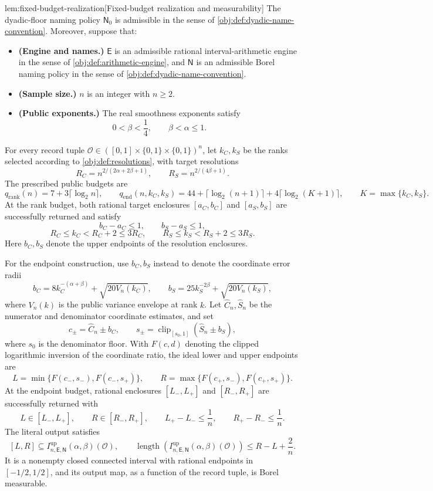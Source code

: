 \documentclass[11pt]{article}
\begin{document}
\begin{lemmav}{lem:fixed-budget-realization}[Fixed-budget realization and measurability]
The dyadic-floor naming policy \(\mathsf N_0\) is admissible in the sense of \cref{obj:def:dyadic-name-convention}. Moreover, suppose that:
\begin{itemize}
\item \textbf{(Engine and names.)} \(\mathsf E\) is an admissible rational interval-arithmetic engine in the sense of \cref{obj:def:arithmetic-engine}, and \(\mathsf N\) is an admissible Borel naming policy in the sense of \cref{obj:def:dyadic-name-convention}.
\item \textbf{(Sample size.)} \(n\) is an integer with \(n\ge2\).
\item \textbf{(Public exponents.)} The real smoothness exponents satisfy
\[
0<\beta<\frac14,\qquad \beta<\alpha\le1.
\]
\end{itemize}
For every record tuple \(\mathcal O\in([0,1]\times\{0,1\}\times\{0,1\})^n\), let \(k_C,k_S\) be the ranks selected according to \cref{obj:def:resolutions}, with target resolutions
\[
R_C=n^{2/(2\alpha+2\beta+1)},\qquad
R_S=n^{2/(4\beta+1)}.
\]
The prescribed public budgets are
\[
q_{\mathrm{rank}}(n)=7+3\lceil\log_2 n\rceil,\qquad
q_{\mathrm{end}}(n,k_C,k_S)
=44+\lceil\log_2(n+1)\rceil
 +4\lceil\log_2(K+1)\rceil,\qquad
K=\max\{k_C,k_S\}.
\]
At the rank budget, both rational target enclosures \([a_C,b_C]\) and \([a_S,b_S]\) are successfully returned and satisfy
\[
b_C-a_C\le1,\qquad b_S-a_S\le1,
\]
\[
R_C\le k_C<R_C+2\le3R_C,\qquad
R_S\le k_S<R_S+2\le3R_S.
\]
Here \(b_C,b_S\) denote the upper endpoints of the resolution enclosures.

For the endpoint construction, use \(b_C,b_S\) instead to denote the coordinate error radii
\[
b_C=8k_C^{-(\alpha+\beta)}+\sqrt{20V_n(k_C)},\qquad
b_S=25k_S^{-2\beta}+\sqrt{20V_n(k_S)},
\]
where \(V_n(k)\) is the public variance envelope at rank \(k\). Let \(\widehat C_n,\widehat S_n\) be the numerator and denominator coordinate estimates, and set
\[
c_\pm=\widehat C_n\pm b_C,\qquad
s_\pm=\operatorname{clip}_{[s_0,1]}(\widehat S_n\pm b_S),
\]
where \(s_0\) is the denominator floor. With \(F(c,d)\) denoting the clipped logarithmic inversion of the coordinate ratio, the ideal lower and upper endpoints are
\[
L=\min\{F(c_-,s_-),F(c_-,s_+)\},\qquad
R=\max\{F(c_+,s_-),F(c_+,s_+)\}.
\]
At the endpoint budget, rational enclosures \([L_-,L_+]\) and \([R_-,R_+]\) are successfully returned with
\[
L\in[L_-,L_+],\qquad R\in[R_-,R_+],\qquad
L_+-L_-\le\frac1n,\qquad R_+-R_-\le\frac1n.
\]
The literal output satisfies
\[
[L,R]\subseteq
I^{\mathrm{up}}_{n,\mathsf E,\mathsf N}(\alpha,\beta)(\mathcal O),
\qquad
\operatorname{length}\!\left(
I^{\mathrm{up}}_{n,\mathsf E,\mathsf N}(\alpha,\beta)(\mathcal O)
\right)
\le R-L+\frac2n.
\]
It is a nonempty closed connected interval with rational endpoints in \([-1/2,1/2]\), and its output map, as a function of the record tuple, is Borel measurable.
\end{lemmav}
\end{document}
